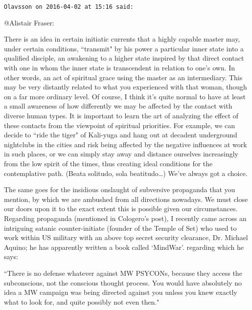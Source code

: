 \begin{footnotesize}
\begin{sffamily}
\hfill

\texttt{Olavsson on 2016-04-02 at 15:16 said: }

@Alistair Fraser:

There is an idea in certain initiatic currents that a highly capable master may, under certain conditions, ``transmit" by his power a particular inner state into a qualified disciple, an awakening to a higher state inspired by that direct contact with one in whom the inner state is transcendent in relation to one's own. In other words, an act of spiritual grace using the master as an intermediary. This may be very distantly related to what you experienced with that woman, though on a far more ordinary level. Of course, I think it's quite normal to have at least a small awareness of how differently we may be affected by the contact with diverse human types. It is important to learn the art of analyzing the effect of these contacts from the viewpoint of spiritual priorities. For example, we can decide to ``ride the tiger" of Kali-yuga and hang out at decadent underground nightclubs in the cities and risk being affected by the negative influences at work in such places, or we can simply stay away and distance ourselves increasingly from the low spirit of the times, thus creating ideal conditions for the contemplative path. (Beata solitudo, sola beatitudo…) We've always got a choice.

The same goes for the insidious onslaught of subversive propaganda that you mention, by which we are ambushed from all directions nowadays. We must close our doors upon it to the exact extent this is possible given our circumstances. Regarding propaganda (mentioned in Cologero's post), I recently came across an intriguing satanic counter-initiate (founder of the Temple of Set) who used to work within US military with an above top secret security clearance, Dr. Michael Aquino; he has apparently written a book called `MindWar'. regarding which he says:

``There is no defense whatever against MW PSYCONs, because they access the subconscious, not the conscious thought process. You would have absolutely no idea a MW campaign was being directed against you unless you knew exactly what to look for, and quite possibly not even then."


\end{sffamily}
\end{footnotesize}
